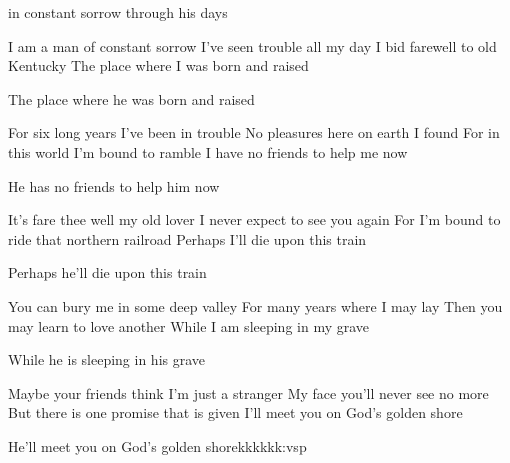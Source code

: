 







in constant sorrow through his days

I am a man of constant sorrow
I've seen trouble all my day
I bid farewell to old Kentucky
The place where I was born and raised

The place where he was born and raised

For six long years I've been in trouble
No pleasures here on earth I found
For in this world I'm bound to ramble
I have no friends to help me now

He has no friends to help him now





















It's fare thee well my old lover
I never expect to see you again
For I'm bound to ride that northern railroad
Perhaps I'll die upon this train

Perhaps he'll die upon this train

You can bury me in some deep valley
For many years where I may lay
Then you may learn to love another
While I am sleeping in my grave

While he is sleeping in his grave

Maybe your friends think I'm just a stranger
My face you'll never see no more
But there is one promise that is given
I'll meet you on God's golden shore

He'll meet you on God's golden shorekkkkkk:vsp







